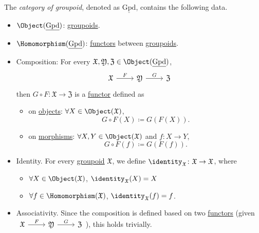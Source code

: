 \begin{definition}\label{def:category-of-groupoid}
	The \emph{category of groupoid}, denoted as \(\underline{\mathrm{Gpd}}\), contains the following data.
	\begin{itemize}
		\item \(\Object (\underline{\mathrm{Gpd}})\): \hyperref[def:groupoid]{groupoids}.
		\item \(\Homomorphism (\underline{\mathrm{Gpd}})\): \hyperref[def:functor]{functors} between \hyperref[def:groupoid]{groupoids}.
		\item Composition: For every \(\mathfrak{X} , \mathfrak{Y}, \mathfrak{Z} \in \Object (\underline{\mathrm{Gpd}})\),
		      \[\begin{tikzcd}
				      {\mathfrak{X}} & {\mathfrak{Y}} & {\mathfrak{Z}}
				      \arrow["F", from=1-1, to=1-2]
				      \arrow["G", from=1-2, to=1-3]
			      \end{tikzcd}\]
		      then \(G\circ F\colon \mathfrak{X} \to \mathfrak{Z}\) is a \hyperref[def:functor]{functor} defined as
		      \begin{itemize}
			      \item on \hyperref[def:object]{objects}: \(\forall X\in \Object (\mathfrak{X})\),
			            \[
				            G\circ F(X)\coloneqq G(F(X)).
			            \]
			      \item on \hyperref[def:morphism]{morphisms}: \(\forall X, Y\in \Object (\mathfrak{X})\) and \(f\colon X\to Y\),
			            \[
				            G\circ F(f)\coloneqq G(F(f)).
			            \]
		      \end{itemize}
		\item Identity. For every \hyperref[def:groupoid]{groupoid} \(\mathfrak{X}\), we define \(\identity_{\mathfrak{X}}\colon \mathfrak{X}\to \mathfrak{X} \), where
		      \begin{itemize}
			      \item \(\forall X\in \Object (\mathfrak{X})\), \(\identity_{\mathfrak{X}}(X) = X \)
			      \item \(\forall f\in \Homomorphism (\mathfrak{X})\), \(\identity_{\mathfrak{X}}(f) = f \).
		      \end{itemize}
		\item Associativity. Since the composition is defined based on two \hyperref[def:functor]{functors} (given \(\begin{tikzcd}
			      {\mathfrak{X}} & {\mathfrak{Y}} & {\mathfrak{Z}}
			      \arrow["F", from=1-1, to=1-2]
			      \arrow["G", from=1-2, to=1-3]
		      \end{tikzcd}\)), this holds trivially.
	\end{itemize}
\end{definition}
